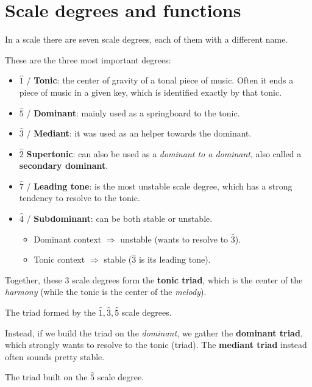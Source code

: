 \section{Scale degrees and functions}
In a scale there are seven scale degrees, each of them with a different name.

These are the three most important degrees:
\begin{itemize}
    \item $\hat 1$ / \textbf{Tonic}: the center of gravity of a tonal piece of music. Often it ends a piece of music in a given key, which is identified exactly by that tonic.
    \item $\hat 5$ / \textbf{Dominant}: mainly used as a springboard to the tonic.
    \item $\hat 3$  / \textbf{Mediant}: it was used as an helper towards the dominant.
    \item $\hat 2$ \textbf{Supertonic}: can also be used as a \emph{dominant to a dominant}, also called a \textbf{secondary dominant}.
    \item $\hat 7$ / \textbf{Leading tone}: is the most unstable scale degree, which has a strong tendency to resolve to the tonic.
    \item $\hat 4$ / \textbf{Subdominant}: can be both stable or unstable.
    \begin{itemize}
        \item Dominant context $\Rightarrow$ unstable (wants to resolve to $\hat 3$).
        \item Tonic context $\Rightarrow$ stable ($\hat 3$ is its leading tone).
    \end{itemize}
\end{itemize}
Together, these 3 scale degrees form the \textbf{tonic triad}, which is the center of the \emph{harmony} (while the tonic is the center of the \emph{melody}).

\begin{definition}
    The triad formed by the $\hat 1, \hat 3, \hat 5$ scale degrees.
\end{definition}

Instead, if we build the triad on the \emph{dominant}, we gather the \textbf{dominant triad}, which strongly wants to resolve to the tonic (triad). The \textbf{mediant triad} instead often sounds pretty stable.

\begin{definition}
    The triad built on the $\hat 5$ scale degree.
\end{definition}

